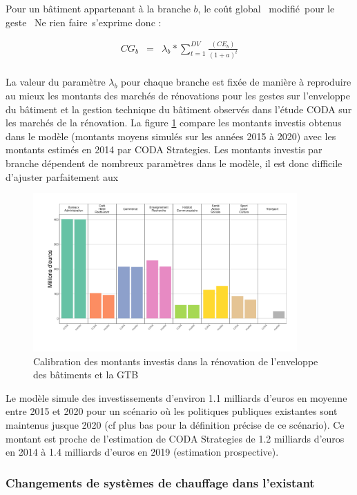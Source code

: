 \documentclass[10.5pt,a4paper]{article}
\begin{document}
{Pour un bâtiment appartenant à la branche $b$, le coût global \og~modifié~\fg pour le geste \og~Ne rien faire~\fg s'exprime donc :
 
\begin{eqnarray}
 CG_b &= &  \lambda_b * \sum_{t = 1}^{DV} \frac{(CE_b)}{(1+a)^t}  \\
\end{eqnarray}

La valeur du paramètre $\lambda_b$ pour chaque branche est fixée de manière à reproduire au mieux les montants des marchés de rénovations pour les gestes sur l'enveloppe du bâtiment et la gestion technique du bâtiment observés dans l'étude CODA sur les marchés de la rénovation. La figure \ref{Comparaison_Renovbati_CODA} compare les montants investis obtenus dans le modèle (montants moyens simulés sur les années 2015 à 2020) avec les montants estimés en 2014 par CODA Strategies. Les montants investis par branche dépendent de nombreux paramètres dans le modèle, il est donc difficile d'ajuster parfaitement aux  

\begin{figure}[h!]
\centering
\caption{Calibration des montants investis dans la rénovation de l'enveloppe des bâtiments et la GTB}\label{Comparaison_Renovbati_CODA}
\includegraphics[width = 0.9\textwidth]{Comparaison_Renovbati_CODA}  
\end{figure}

Le modèle simule des investissements d'environ 1.1 milliards d'euros en moyenne entre 2015 et 2020 pour un scénario où les politiques publiques existantes sont maintenus jusque 2020 (cf plus bas pour la définition précise de ce scénario). Ce montant est proche de l'estimation de CODA Strategies de 1.2 milliards d'euros en 2014 à 1.4 milliards d'euros en 2019 (estimation prospective).  

\subsubsection{Changements de systèmes de chauffage dans l'existant}

}
\end{document}
